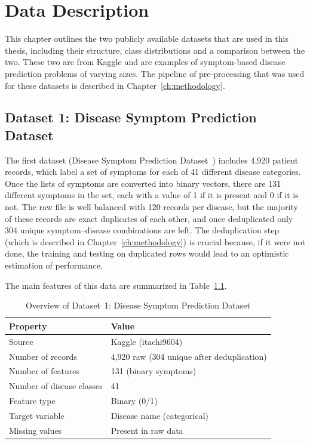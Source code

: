 \chapter{Data Description}
\label{ch:data_description}

This chapter outlines the two publicly available datasets that are used in this thesis, including their structure, class distributions and a comparison between the two. These two are from Kaggle and are examples of symptom-based disease prediction problems of varying sizes. The pipeline of pre-processing that was used for these datasets is described in Chapter~\ref{ch:methodology}.

\section{Dataset 1: Disease Symptom Prediction Dataset}
\label{sec:dataset1}

The first dataset (Disease Symptom Prediction Dataset~\citep{Kaggle_Disease2020}) includes 4,920 patient records, which label a set of symptoms for each of 41 different disease categories. Once the lists of symptoms are converted into binary vectors, there are 131 different symptoms in the set, each with a value of 1 if it is present and 0 if it is not. The raw file is well balanced with 120 records per disease, but the majority of these records are exact duplicates of each other, and once deduplicated only 304 unique symptom--disease combinations are left. The deduplication step (which is described in Chapter~\ref{ch:methodology}) is crucial because, if it were not done, the training and testing on duplicated rows would lead to an optimistic estimation of performance.

The main features of this data are summarized in Table~\ref{tab:dataset1_overview}.

\begin{table}[H]
\centering
\caption{Overview of Dataset~1: Disease Symptom Prediction Dataset}
\label{tab:dataset1_overview}
\begin{tabular}{@{}ll@{}}
\toprule
\textbf{Property}         & \textbf{Value} \\
\midrule
Source                     & Kaggle (itachi9604) \\
Number of records          & 4,920 raw (304 unique after deduplication) \\
Number of features         & 131 (binary symptoms) \\
Number of disease classes  & 41 \\
Feature type               & Binary (0/1) \\
Target variable            & Disease name (categorical) \\
Missing values             & Present in raw data \\
\bottomrule
\end{tabular}
\end{table}

